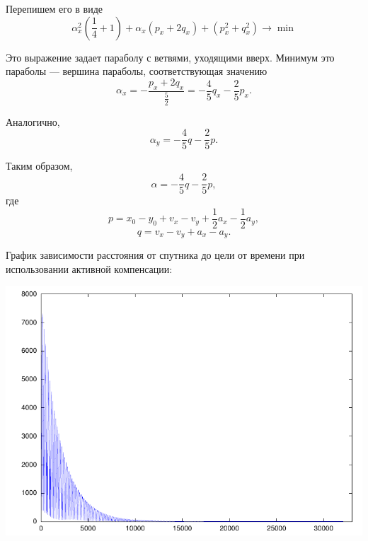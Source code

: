 \documentclass[a4paper]{article}
\begin{document}
Перепишем его в виде
$$\alpha_x^2(\frac14+1)+\alpha_x(p_x+2q_x)+(p_x^2+q_x^2)\rightarrow\min$$

Это выражение задает параболу с ветвями, уходящими вверх. Минимум это параболы --- вершина параболы, соответствующая значению
$$\alpha_x=-\frac{p_x+2q_x}{\frac52}=-\frac45q_x-\frac25p_x.$$

Аналогично, $$\alpha_y=-\frac45q-\frac25p.$$

Таким образом,
$$\alpha=-\frac45q-\frac25p,$$
где
$$p=x_0-y_0+v_x-v_y+\frac12a_x-\frac12a_y,$$
$$q=v_x-v_y+a_x-a_y.$$

График зависимости расстояния от спутника до цели от времени при использовании активной компенсации:

\includegraphics[width=\textwidth]{active-chase}
\end{document}

